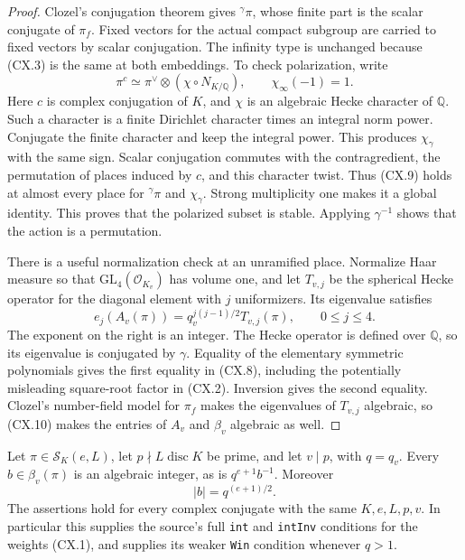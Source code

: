 \begin{proof}
Clozel's conjugation theorem gives ${}^{\gamma}\pi$, whose
finite part is the scalar conjugate of $\pi_f$.  Fixed vectors
for the actual compact subgroup are carried to fixed vectors by
scalar conjugation.  The infinity type is unchanged because
(CX.3) is the same at both embeddings.  To check polarization,
write
\[
                 \pi^c\simeq\pi^\vee\otimes(\chi\circ N_{K/\mathbb Q}),
 \qquad \chi_\infty(-1)=1.                                   \tag{CX.9}
\]
Here $c$ is complex conjugation of $K$, and $\chi$ is an
algebraic Hecke character of $\mathbb Q$.  Such a character is a
finite Dirichlet character times an integral norm power.
Conjugate the finite character and keep the integral power.
This produces $\chi_\gamma$ with the same sign.  Scalar
conjugation commutes with the contragredient, the permutation of
places induced by $c$, and this character twist.  Thus (CX.9)
holds at almost every place for ${}^{\gamma}\pi$ and
$\chi_\gamma$.  Strong multiplicity one makes it a global
identity.  This proves that the polarized subset is stable.
Applying $\gamma^{-1}$ shows that the action is a permutation.

There is a useful normalization check at an unramified place.
Normalize Haar measure so that $\mathrm{GL}_4(\mathcal O_{K_v})$
has volume one, and let $T_{v,j}$ be the spherical Hecke
operator for the diagonal element with $j$ uniformizers.  Its
eigenvalue satisfies
\[
 e_j(A_v(\pi))=q_v^{j(j-1)/2}T_{v,j}(\pi),\qquad 0\le j\le4.
                                                               \tag{CX.10}
\]
The exponent on the right is an integer.  The Hecke operator is
defined over $\mathbb Q$, so its eigenvalue is conjugated by
$\gamma$.  Equality of the elementary symmetric polynomials
gives the first equality in (CX.8), including the potentially
misleading square-root factor in (CX.2).  Inversion gives the
second equality.  Clozel's number-field model for $\pi_f$
makes the eigenvalues of $T_{v,j}$ algebraic, so (CX.10) makes
the entries of $A_v$ and $\beta_v$ algebraic as well.
\end{proof}

\begin{proposition}
\label{claim:CX3}
Let $\pi\in\mathcal S_K(e,L)$, let $p\nmid L\operatorname{disc}K$
be prime, and let $v\mid p$, with $q=q_v$.  Every
$b\in\beta_v(\pi)$ is an algebraic integer, as is $q^{e+1}b^{-1}$.
Moreover
\[
                 |b|=q^{(e+1)/2}.                            \tag{CX.11}
\]
The assertions hold for every complex conjugate with the same
$K,e,L,p,v$.  In particular this supplies the source's full
\texttt{int} and \texttt{intInv} conditions for the weights
(CX.1), and supplies its weaker \texttt{Win} condition whenever
$q>1$.
\end{proposition}

